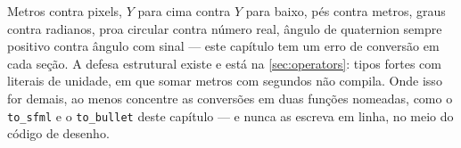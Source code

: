\begin{regra}
Metros contra pixels, $Y$ para cima contra $Y$ para baixo, pés contra metros,
graus contra radianos, proa circular contra número real, ângulo de quaternion
sempre positivo contra ângulo com sinal --- este capítulo tem um erro de
conversão em cada seção. A defesa estrutural existe e está na
\cref{sec:operators}: tipos fortes com literais de unidade, em que somar metros
com segundos não compila. Onde isso for demais, ao menos concentre as conversões
em duas funções nomeadas, como o \texttt{to\_sfml} e o
\texttt{to\_bullet} deste capítulo --- e nunca as escreva em linha, no meio
do código de desenho.
\end{regra}
